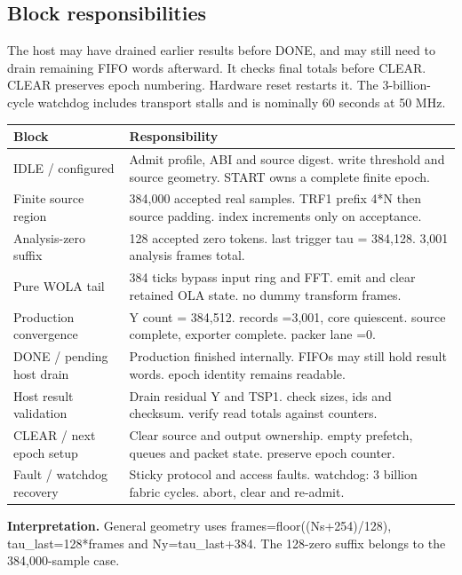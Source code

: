 \documentclass[11pt,letterpaper]{article}
\begin{document}
\subsection*{Block responsibilities}
The host may have drained earlier results before DONE, and may still need to drain remaining FIFO words afterward. It checks final totals before CLEAR. CLEAR preserves epoch numbering. Hardware reset restarts it. The 3-billion-cycle watchdog includes transport stalls and is nominally 60 seconds at 50 MHz.
\par\medskip\noindent
\begin{tabularx}{\linewidth}{@{}>{\raggedright\arraybackslash}p{1.65in}Y@{}}\toprule
\textbf{Block} & \textbf{Responsibility} \\ \midrule
IDLE / configured & Admit profile, ABI and source digest. write threshold and source geometry. START owns a complete finite epoch. \\[5pt]
Finite source region & 384,000 accepted real samples. TRF1 prefix 4*N then source padding. index increments only on acceptance. \\[5pt]
Analysis-zero suffix & 128 accepted zero tokens. last trigger tau = 384,128. 3,001 analysis frames total. \\[5pt]
Pure WOLA tail & 384 ticks bypass input ring and FFT. emit and clear retained OLA state. no dummy transform frames. \\[5pt]
Production convergence & Y count = 384,512. records =3,001, core quiescent. source complete, exporter complete. packer lane =0. \\[5pt]
DONE / pending host drain & Production finished internally. FIFOs may still hold result words. epoch identity remains readable. \\[5pt]
Host result validation & Drain residual Y and TSP1. check sizes, ids and checksum. verify read totals against counters. \\[5pt]
CLEAR / next epoch setup & Clear source and output ownership. empty prefetch, queues and packet state. preserve epoch counter. \\[5pt]
Fault / watchdog recovery & Sticky protocol and access faults. watchdog: 3 billion fabric cycles. abort, clear and re-admit. \\[5pt]
\bottomrule\end{tabularx}
\vspace{8pt}
\noindent\textbf{Interpretation.} General geometry uses frames=floor((Ns+254)/128), tau\_last=128*frames and Ny=tau\_last+384. The 128-zero suffix belongs to the 384,000-sample case.
\clearpage
\end{document}
